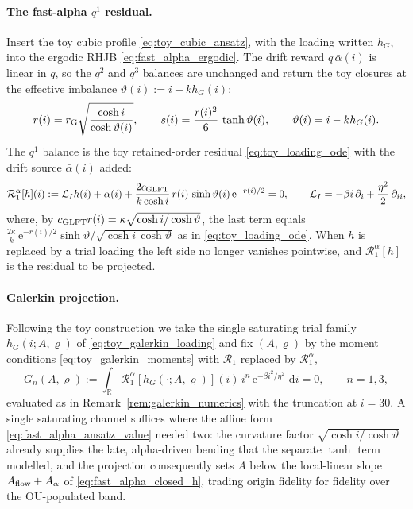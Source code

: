 \documentclass[11pt,a4paper]{article}
\newcommand{\R}{\mathbb{R}}
\newcommand{\Lcal}{\mathcal{L}}
\newcommand{\dd}{\,\mathrm{d}}
\newcommand{\e}{\mathrm e}
\newcommand{\alphabar}{\bar\alpha}
\theoremstyle{plain}
\theoremstyle{definition}
\begin{document}
\paragraph{The fast-alpha \(q^1\) residual.}
Insert the toy cubic profile \eqref{eq:toy_cubic_ansatz}, with the loading
written \(h_G\), into the ergodic RHJB \eqref{eq:fast_alpha_ergodic}.  The
drift reward \(q\,\alphabar(i)\) is linear in \(q\), so the \(q^2\) and \(q^3\)
balances are unchanged and return the toy closures at the effective imbalance
\(\vartheta(i):=i-kh_G(i)\):
\begin{equation}
r(i)=r_{\rm G}\sqrt{\frac{\cosh i}{\cosh\vartheta(i)}},
\qquad
s(i)=\frac{r(i)^2}{6}\,\tanh\vartheta(i),
\qquad
\vartheta(i)=i-kh_G(i).
\label{eq:fa_curvature_rs}
\end{equation}
The \(q^1\) balance is the toy retained-order residual
\eqref{eq:toy_loading_ode} with the drift source \(\alphabar(i)\) added:
\begin{equation}
\mathcal R_1^{\alpha}[h](i)
:=\Lcal_I h(i)+\alphabar(i)
+\frac{2c_{\rm GLFT}}{k\cosh i}\,r(i)\,\sinh\vartheta(i)\,\e^{-r(i)/2}=0,
\qquad
\Lcal_I=-\beta i\,\partial_i+\frac{\eta^2}{2}\,\partial_{ii},
\label{eq:fa_loading_residual}
\end{equation}
where, by \(c_{\rm GLFT}r(i)=\kappa\sqrt{\cosh i/\cosh\vartheta}\), the last
term equals
\(\tfrac{2\kappa}{k}\,\e^{-r(i)/2}\sinh\vartheta/\sqrt{\cosh i\,\cosh\vartheta}\)
as in \eqref{eq:toy_loading_ode}.  When \(h\) is replaced by a trial loading the
left side no longer vanishes pointwise, and \(\mathcal R_1^{\alpha}[h]\) is the
residual to be projected.

\paragraph{Galerkin projection.}
Following the toy construction we take the single saturating trial family
\(h_G(i;A,\varrho)\) of \eqref{eq:toy_galerkin_loading} and fix
\((A,\varrho)\) by the moment conditions \eqref{eq:toy_galerkin_moments} with
\(\mathcal R_1\) replaced by \(\mathcal R_1^\alpha\),
\[
G_n(A,\varrho):=\int_{\R}\mathcal R_1^{\alpha}[h_G(\cdot;A,\varrho)](i)\,i^n\,
\e^{-\beta i^2/\eta^2}\,\dd i=0,\qquad n=1,3,
\]
evaluated as in Remark~\ref{rem:galerkin_numerics} with the truncation at
\(i=30\).  A single saturating channel suffices where the affine form
\eqref{eq:fast_alpha_ansatz_value} needed two: the curvature factor
\(\sqrt{\cosh i/\cosh\vartheta}\) already supplies the late, alpha-driven
bending that the separate \(\tanh\) term modelled, and the projection
consequently sets \(A\) below the local-linear slope \(A_{\rm flow}+A_\alpha\)
of \eqref{eq:fast_alpha_closed_h}, trading origin fidelity for fidelity over
the OU-populated band.
\end{document}
